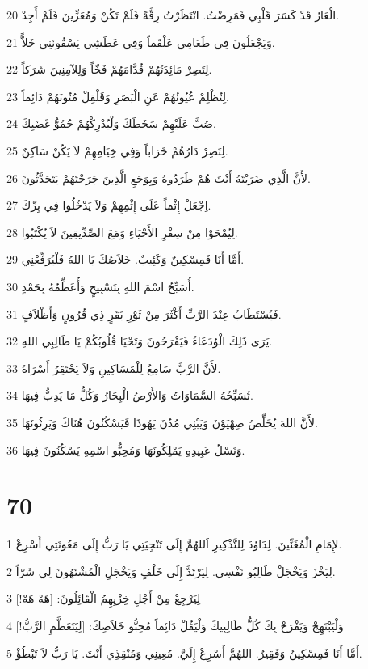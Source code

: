 \par 20 الْعَارُ قَدْ كَسَرَ قَلْبِي فَمَرِضْتُ. انْتَظَرْتُ رِقَّةً فَلَمْ تَكُنْ وَمُعَزِّينَ فَلَمْ أَجِدْ.
\par 21 وَيَجْعَلُونَ فِي طَعَامِي عَلْقَماً وَفِي عَطَشِي يَسْقُونَنِي خَلاًّ.
\par 22 لِتَصِرْ مَائِدَتُهُمْ قُدَّامَهُمْ فَخّاً وَلِلآمِنِينَ شَرَكاً.
\par 23 لِتُظْلِمْ عُيُونُهُمْ عَنِ الْبَصَرِ وَقَلْقِلْ مُتُونَهُمْ دَائِماً.
\par 24 صُبَّ عَلَيْهِمْ سَخَطَكَ وَلْيُدْرِكْهُمْ حُمُوُّ غَضَبِكَ.
\par 25 لِتَصِرْ دَارُهُمْ خَرَاباً وَفِي خِيَامِهِمْ لاَ يَكُنْ سَاكِنٌ.
\par 26 لأَنَّ الَّذِي ضَرَبْتَهُ أَنْتَ هُمْ طَرَدُوهُ وَبِوَجَعِ الَّذِينَ جَرَحْتَهُمْ يَتَحَدَّثُونَ.
\par 27 اِجْعَلْ إِثْماً عَلَى إِثْمِهِمْ وَلاَ يَدْخُلُوا فِي بِرِّكَ.
\par 28 لِيُمْحَوْا مِنْ سِفْرِ الأَحْيَاءِ وَمَعَ الصِّدِّيقِينَ لاَ يُكْتَبُوا.
\par 29 أَمَّا أَنَا فَمِسْكِينٌ وَكَئِيبٌ. خَلاَصُكَ يَا اللهُ فَلْيُرَفِّعْنِي.
\par 30 أُسَبِّحُ اسْمَ اللهِ بِتَسْبِيحٍ وَأُعَظِّمُهُ بِحَمْدٍ.
\par 31 فَيُسْتَطَابُ عِنْدَ الرَّبِّ أَكْثَرَ مِنْ ثَوْرِ بَقَرٍ ذِي قُرُونٍ وَأَظْلاَفٍ.
\par 32 يَرَى ذَلِكَ الْوُدَعَاءُ فَيَفْرَحُونَ وَتَحْيَا قُلُوبُكُمْ يَا طَالِبِي اللهِ.
\par 33 لأَنَّ الرَّبَّ سَامِعٌ لِلْمَسَاكِينِ وَلاَ يَحْتَقِرُ أَسْرَاهُ.
\par 34 تُسَبِّحُهُ السَّمَاوَاتُ وَالأَرْضُ الْبِحَارُ وَكُلُّ مَا يَدِبُّ فِيهَا.
\par 35 لأَنَّ اللهَ يُخَلِّصُ صِهْيَوْنَ وَيَبْنِي مُدُنَ يَهُوذَا فَيَسْكُنُونَ هُنَاكَ وَيَرِثُونَهَا.
\par 36 وَنَسْلُ عَبِيدِهِ يَمْلِكُونَهَا وَمُحِبُّو اسْمِهِ يَسْكُنُونَ فِيهَا.

\chapter{70}

\par 1 لإِمَامِ الْمُغَنِّينَ. لِدَاوُدَ لِلتَّذْكِيرِ اَللهُمَّ إِلَى تَنْجِيَتِي يَا رَبُّ إِلَى مَعُونَتِي أَسْرِعْ.
\par 2 لِيَخْزَ وَيَخْجَلْ طَالِبُو نَفْسِي. لِيَرْتَدَّ إِلَى خَلْفٍ وَيَخْجَلِ الْمُشْتَهُونَ لِي شَرّاً.
\par 3 لِيَرْجِعْ مِنْ أَجْلِ خِزْيِهِمُ الْقَائِلُونَ: [هَهْ هَهْ!]
\par 4 وَلْيَبْتَهِجْ وَيَفْرَحْ بِكَ كُلُّ طَالِبِيكَ وَلْيَقُلْ دَائِماً مُحِبُّو خَلاَصِكَ: [لِيَتَعَظَّمِ الرَّبُّ!]
\par 5 أَمَّا أَنَا فَمِسْكِينٌ وَفَقِيرٌ. اللهُمَّ أَسْرِعْ إِلَيَّ. مُعِينِي وَمُنْقِذِي أَنْتَ. يَا رَبُّ لاَ تَبْطُؤْ.

